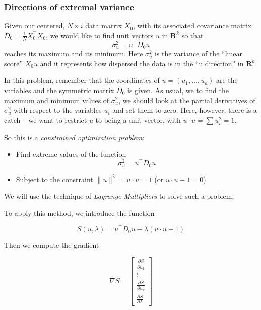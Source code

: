 \documentclass[
]{article}
\providecommand{\tightlist}{%
  \setlength{\itemsep}{0pt}\setlength{\parskip}{0pt}}
\begin{document}
\hypertarget{sec:extremalvariance}{%
\subsubsection{Directions of extremal
variance}\label{sec:extremalvariance}}

Given our centered, \(N\times i\) data matrix \(X_{0}\), with its
associated covariance matrix
\(D_{0}=\frac{1}{N}X_{0}^{\intercal}X_{0}\), we would like to find unit
vectors \(u\) in \(\mathbf{R}^{k}\) so that \[
\sigma_{u}^{2} = u^{\intercal}D_{0}u
\] reaches its maximum and its minimum. Here \(\sigma_{u}^2\) is the
variance of the ``linear score'' \(X_{0}u\) and it represents how
dispersed the data is in the ``u direction'' in \(\mathbf{R}^{k}\).

In this problem, remember that the coordinates of
\(u=(u_1,\ldots, u_{k})\) are the variables and the symmetric matrix
\(D_{0}\) is given. As usual, we to find the maximum and minimum values
of \(\sigma_{u}^{2}\), we should look at the partial derivatives of
\(\sigma_{u}^{2}\) with respect to the variables \(u_{i}\) and set them
to zero. Here, however, there is a catch -- we want to restrict \(u\) to
being a unit vector, with \(u\cdot u =\sum u_{i}^2=1\).

So this is a \emph{constrained optimization problem}:

\begin{itemize}
\tightlist
\item
  Find extreme values of the function \[
  \sigma_{u}^{2} = u^{\intercal}D_{0}u
  \]
\item
  Subject to the constraint \(\|u\|^2 = u\cdot u=1\) (or
  \(u\cdot u-1=0\))
\end{itemize}

We will use the technique of \emph{Lagrange Multipliers} to solve such a
problem.

To apply this method, we introduce the function

\begin{equation}
S(u, \lambda) = u^{\intercal}D_{0}u - \lambda(u\cdot u -1)
\label{eq:lagrange}\end{equation}

Then we compute the gradient

\begin{equation}
\nabla S = \left[\begin{matrix} \frac{\partial S}{\partial u_{1}} \\ \vdots \\ \frac{\partial S}{\partial u_{k}} \\ \frac{\partial S}{\partial \lambda}\end{matrix}\right]
\label{eq:lagrangegradient}\end{equation}
\end{document}
